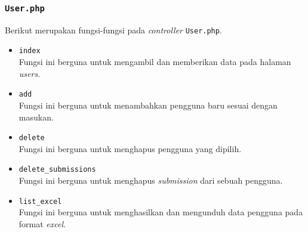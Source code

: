 \subsubsection{\texttt{User.php}}
Berikut merupakan fungsi-fungsi pada \textit{controller} \texttt{User.php}.
\begin{itemize}
	\item \texttt{index}\\
	Fungsi ini berguna untuk mengambil dan memberikan data pada halaman \textit{users}.
	\item \texttt{add}\\
	Fungsi ini berguna untuk menambahkan pengguna baru sesuai dengan masukan.
	\item \texttt{delete}\\
	Fungsi ini berguna untuk menghapus pengguna yang dipilih.
	\item \texttt{delete\_submissions}\\
	Fungsi ini berguna untuk menghapus \textit{submission} dari sebuah pengguna.
	\item \texttt{list\_excel}\\
	Fungsi ini berguna untuk menghasilkan dan mengunduh data pengguna pada format \textit{excel}.
\end{itemize}